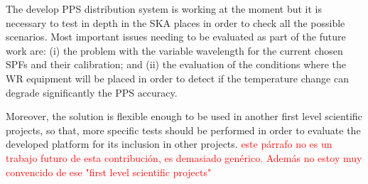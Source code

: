 The develop PPS distribution system is working at the moment but it is 
necessary to test in depth in the SKA places in order to check all the 
possible scenarios. Most important issues needing to be evaluated as part of 
the future work are: (i) the problem with the variable wavelength for the 
current chosen SPFs and their calibration; and (ii) the evaluation of the 
conditions where the WR equipment will be placed in order to detect if the 
temperature change can degrade significantly the PPS accuracy.

Moreover, the solution is flexible enough to be used in another first level 
scientific projects, so that, more specific tests should be performed in order 
to evaluate the developed platform for its inclusion in other projects.
\textcolor{red}{este párrafo no es un trabajo futuro de esta contribución, es demasiado genérico. Además no estoy muy convencido de ese "first level scientific projects"}
